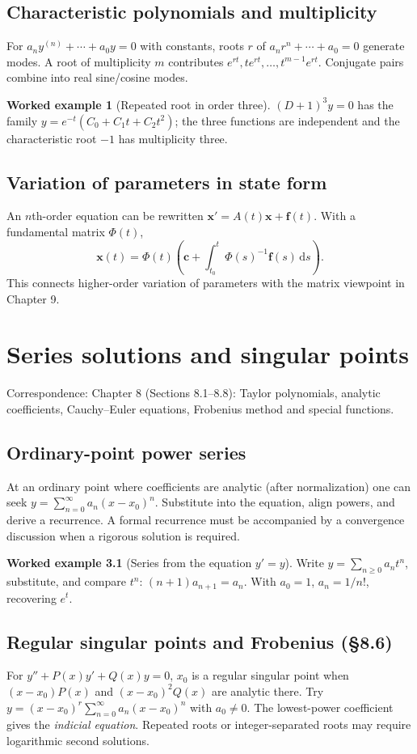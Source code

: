 \documentclass[11pt,letterpaper,oneside]{report}
\theoremstyle{definition}\newtheorem{definition}[theorem]{Definition}
\newtheorem{example}[theorem]{Worked example}
\theoremstyle{remark}\newtheorem{remark}[theorem]{Remark}
\newcommand{\dd}{\,\mathrm{d}}
\begin{document}
\section{Characteristic polynomials and multiplicity}
For $a_n y^{(n)}+\cdots+a_0y=0$ with constants, roots $r$ of $a_nr^n+\cdots+a_0=0$ generate modes. A root of multiplicity $m$ contributes $e^{rt},te^{rt},\ldots,t^{m-1}e^{rt}$. Conjugate pairs combine into real sine/cosine modes.
\begin{example}[Repeated root in order three]
$(D+1)^3y=0$ has the family $y=e^{-t}(C_0+C_1 t+C_2t^2)$; the three functions are independent and the characteristic root $-1$ has multiplicity three.
\end{example}
\section{Variation of parameters in state form}
An $n$th-order equation can be rewritten $\mathbf x'=A(t)\mathbf x+\mathbf f(t)$. With a fundamental matrix $\Phi(t)$,
\[\mathbf x(t)=\Phi(t)\left(\mathbf c+\int_{t_0}^{t}\Phi(s)^{-1}\mathbf f(s)\dd s\right).\]
This connects higher-order variation of parameters with the matrix viewpoint in Chapter 9.
\chapter{Series solutions and singular points}
\begin{bookground}Correspondence: Chapter 8 (Sections 8.1--8.8): Taylor polynomials, analytic coefficients, Cauchy--Euler equations, Frobenius method and special functions.\end{bookground}
\section{Ordinary-point power series}
At an ordinary point where coefficients are analytic (after normalization) one can seek $y=\sum_{n=0}^\infty a_n(x-x_0)^n$. Substitute into the equation, align powers, and derive a recurrence. A formal recurrence must be accompanied by a convergence discussion when a rigorous solution is required.
\begin{example}[Series from the equation $y'=y$]
Write $y=\sum_{n\ge0} a_n t^n$, substitute, and compare $t^n$: $(n+1)a_{n+1}=a_n$. With $a_0=1$, $a_n=1/n!$, recovering $e^t$.
\end{example}
\section{Regular singular points and Frobenius (\S8.6)}
For $y''+P(x)y'+Q(x)y=0$, $x_0$ is a regular singular point when $(x-x_0)P(x)$ and $(x-x_0)^2Q(x)$ are analytic there. Try $y=(x-x_0)^r\sum_{n=0}^\infty a_n(x-x_0)^n$ with $a_0\ne0$. The lowest-power coefficient gives the \emph{indicial equation}. Repeated roots or integer-separated roots may require logarithmic second solutions.
\end{document}
